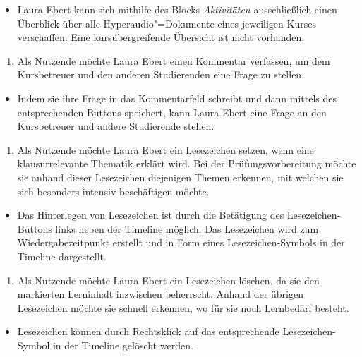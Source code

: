 \begin{itemize}[resume*]
\item[\Asterisk]
Laura Ebert kann sich mithilfe des Blocks \textit{Aktivitäten} ausschließlich einen Überblick über alle Hyperaudio"=Dokumente eines jeweiligen Kurses verschaffen. Eine kursübergreifende Übersicht ist nicht vorhanden.
\end{itemize}
\vspace{0.25cm}
\begin{enumerate}[resume*]
\item \label{US-Kommentar-S-Eval} Als Nutzende möchte Laura Ebert einen Kommentar verfassen, um dem Kursbetreuer und den anderen Studierenden eine Frage zu stellen.
\end{enumerate}
\begin{itemize}[resume*]
\item[\Checkmark]
Indem sie ihre Frage in das Kommentarfeld schreibt und dann mittels des entsprechenden Buttons speichert, kann Laura Ebert eine Frage an den Kursbetreuer und andere Studierende stellen.
\end{itemize}
\vspace{0.25cm}
\begin{enumerate}[resume*]
\item \label{US-Lesezeichen-Eval} Als Nutzende möchte Laura Ebert ein Lesezeichen setzen, wenn eine klausurrelevante Thematik erklärt wird. Bei der Prüfungsvorbereitung möchte sie anhand dieser Lesezeichen diejenigen Themen erkennen, mit welchen sie sich besonders intensiv beschäftigen möchte.
\end{enumerate}
\begin{itemize}[resume*]
\item[\Checkmark]
Das Hinterlegen von Lesezeichen ist durch die Betätigung des Lesezeichen-Buttons links neben der Timeline möglich. Das Lesezeichen wird zum Wiedergabezeitpunkt erstellt und in Form eines Lesezeichen-Symbols in der Timeline dargestellt.
\end{itemize}
\vspace{0.25cm}
\begin{enumerate}[resume*]
\item \label{US-Lesezeichen-Loeschen-Eval} Als Nutzende möchte Laura Ebert ein Lesezeichen löschen, da sie den markierten Lerninhalt inzwischen beherrscht. Anhand der übrigen Lesezeichen möchte sie schnell erkennen, wo für sie noch Lernbedarf besteht.
\end{enumerate}
\begin{itemize}[resume*]
\item[\Checkmark]
Lesezeichen können durch Rechtsklick auf das entsprechende Lesezeichen-Symbol in der Timeline gelöscht werden.
\end{itemize}
